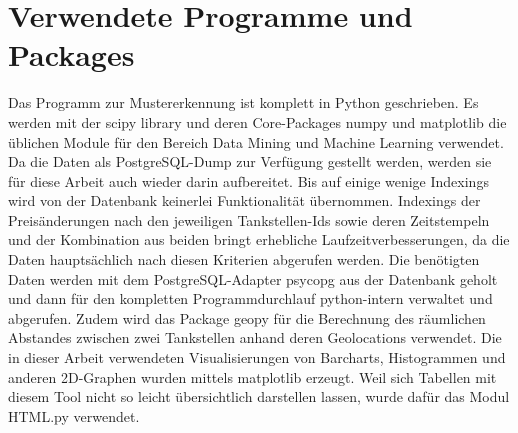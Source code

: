 \section{Verwendete Programme und Packages}
Das Programm zur Mustererkennung ist komplett in Python geschrieben. Es werden mit der scipy library und deren Core-Packages numpy und matplotlib die üblichen Module für den Bereich Data Mining und Machine Learning verwendet. Da die Daten als PostgreSQL-Dump zur Verfügung gestellt werden, werden sie für diese Arbeit auch wieder darin aufbereitet. Bis auf einige wenige Indexings wird von der Datenbank keinerlei Funktionalität übernommen. Indexings der Preisänderungen nach den jeweiligen Tankstellen-Ids sowie deren Zeitstempeln und der Kombination aus beiden bringt erhebliche Laufzeitverbesserungen, da die Daten hauptsächlich nach diesen Kriterien abgerufen werden. Die benötigten Daten werden mit dem PostgreSQL-Adapter psycopg aus der Datenbank geholt und dann für den kompletten Programmdurchlauf python-intern verwaltet und abgerufen. Zudem wird das Package geopy für die Berechnung des räumlichen Abstandes zwischen zwei Tankstellen anhand deren Geolocations verwendet. Die in dieser Arbeit verwendeten Visualisierungen von Barcharts, Histogrammen und anderen 2D-Graphen wurden mittels matplotlib erzeugt. Weil sich Tabellen mit diesem Tool nicht so leicht übersichtlich darstellen lassen, wurde dafür das Modul HTML.py verwendet. 